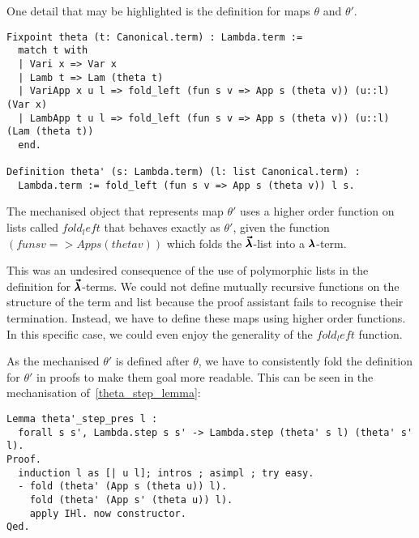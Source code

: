 One detail that may be highlighted is the definition for maps $\theta$ and $\theta'$.
\begin{lstlisting}[language=Coq]
Fixpoint theta (t: Canonical.term) : Lambda.term :=
  match t with
  | Vari x => Var x
  | Lamb t => Lam (theta t)
  | VariApp x u l => fold_left (fun s v => App s (theta v)) (u::l) (Var x)
  | LambApp t u l => fold_left (fun s v => App s (theta v)) (u::l) (Lam (theta t))
  end.

Definition theta' (s: Lambda.term) (l: list Canonical.term) :
  Lambda.term := fold_left (fun s v => App s (theta v)) l s.
\end{lstlisting}

The mechanised object that represents map $\theta'$ uses a higher order function on lists called \lst$fold_left$ that behaves exactly as $\theta'$, given the function \lst$(fun s v => App s (theta v))$ which folds the $\pmb{\vec \lambda}$-list into a $\pmb{\lambda}$-term.

This was an undesired consequence of the use of polymorphic lists in the definition for $\pmb{\vec \lambda}$-terms.
We could not define mutually recursive functions on the structure of the term and list because the proof assistant fails to recognise their termination.
Instead, we have to define these maps using higher order functions.
In this specific case, we could even enjoy the generality of the \lst$fold_left$ function.

As the mechanised $\theta'$ is defined after $\theta$, we have to consistently fold the definition for $\theta'$ in proofs to make them goal more readable.
This can be seen in the mechanisation of~\cref{theta_step_lemma}:
\begin{lstlisting}[language=Coq]
Lemma theta'_step_pres l :
  forall s s', Lambda.step s s' -> Lambda.step (theta' s l) (theta' s' l).
Proof.
  induction l as [| u l]; intros ; asimpl ; try easy.
  - fold (theta' (App s (theta u)) l).
    fold (theta' (App s' (theta u)) l).
    apply IHl. now constructor.
Qed.
\end{lstlisting}


